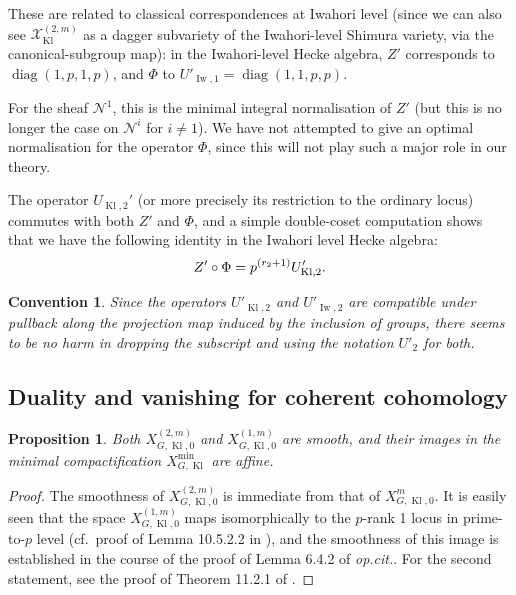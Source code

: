 \documentclass[cjm]{ipart}
\theoremstyle{plain}
\newtheorem{proposition}[theorem]{Proposition}
\newtheorem*{convention}{Convention}
\theoremstyle{remark}
\DeclareMathOperator{\diag}{diag}
\DeclareMathOperator{\Iw}{Iw}
\DeclareMathOperator{\Kl}{Kl}
\newcommand{\cN}{\mathcal{N}}
\newcommand{\cX}{\mathcal{X}}
\numberwithin{equation}{subsection}
\begin{document}
  These are related to classical correspondences at Iwahori level (since we can also see $\cX_{\Kl}^{(2, m)}$ as a dagger subvariety of the Iwahori-level Shimura variety, via the canonical-subgroup map): in the Iwahori-level Hecke algebra, $Z'$ corresponds to $\diag(1, p, 1, p)$, and $\Phi$ to $U'_{\Iw, 1} = \diag(1, 1, p, p)$.

  \begin{remark}
   For the sheaf $\cN^1$, this is the minimal integral normalisation of $Z'$ (but this is no longer the case on $\cN^i$ for $i \ne 1$). We have not attempted to give an optimal normalisation for the operator $\Phi$, since this will not play such a major role in our theory.
  \end{remark}

  \begin{note}
   The operator $U_{\Kl, 2}'$ (or more precisely its restriction to the ordinary locus) commutes with both $Z'$ and $\Phi$, and a simple double-coset computation shows that we have the following identity in the Iwahori level Hecke algebra:
   \begin{equation}
    \label{eq:commutationrelation}
    Z' \circ \Phi = p^{(r_2 + 1)} U'_{\Kl, 2}. \qedhere
   \end{equation}
  \end{note}

  \begin{convention}
   Since the operators $U'_{\operatorname{Kl}, 2}$ and $U'_{\operatorname{Iw}, 2}$ are compatible under pullback along the projection map induced by the inclusion of groups, there seems to be no harm in dropping the subscript and using the notation $U'_2$ for both.
  \end{convention}


 \subsection{Duality and vanishing for coherent cohomology}
  \label{sect:dualitycoherent}
  \begin{proposition}
   Both $X_{G,\Kl,0}^{(2, m)}$ and $X_{G,\Kl,0}^{(1, m)}$ are smooth, and their images in the minimal compactification $X_{G,\Kl}^{\mathrm{min}}$ are affine. %
  \end{proposition}

  \begin{proof}
   The smoothness of $X_{G,\Kl,0}^{(2, m)}$ is immediate from that of $X_{G,\Kl,0}^m$. It is easily seen that the space $X_{G,\Kl,0}^{(1, m)}$ maps isomorphically to the $p$-rank 1 locus in prime-to-$p$ level (cf.~proof of Lemma 10.5.2.2 in \cite{pilloni20}), and the smoothness of this image is established in the course of the proof of Lemma 6.4.2 of \emph{op.cit.}. For the second statement, see the proof of Theorem 11.2.1 of \cite{pilloni20}.
  \end{proof}
\end{document}
